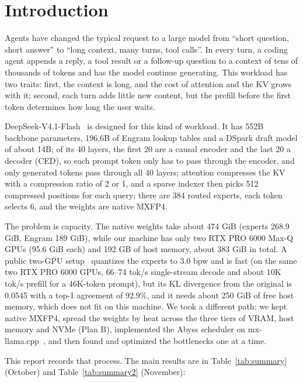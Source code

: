 \documentclass[11pt,a4paper]{article}
\newcommand{\tps}{tok/s}
\begin{document}
\newpage
\tableofcontents
\newpage

\section{Introduction}

Agents have changed the typical request to a large model from ``short question, short answer'' to ``long context, many turns, tool calls''. In every turn, a coding agent appends a reply, a tool result or a follow-up question to a context of tens of thousands of tokens and has the model continue generating. This workload has two traits: first, the context is long, and the cost of attention and the KV grows with it; second, each turn adds little new content, but the prefill before the first token determines how long the user waits.

DeepSeek-V4.1-Flash~\cite{v41} is designed for this kind of workload. It has 552B backbone parameters, 196.6B of Engram lookup tables and a DSpark draft model of about 14B; of its 40 layers, the first 20 are a causal encoder and the last 20 a decoder (CED), so each prompt token only has to pass through the encoder, and only generated tokens pass through all 40 layers; attention compresses the KV with a compression ratio of 2 or 1, and a sparse indexer then picks 512 compressed positions for each query; there are 384 routed experts, each token selects 6, and the weights are native MXFP4.

The problem is capacity. The native weights take about 474 GiB (experts 268.9 GiB, Engram 189 GiB), while our machine has only two RTX PRO 6000 Max-Q GPUs (95.6 GiB each) and 192 GB of host memory, about 383 GiB in total. A public two-GPU setup~\cite{diffbot} quantizes the experts to 3.0 bpw and is fast (on the same two RTX PRO 6000 GPUs, 66--74 \tps{} single-stream decode and about 10K \tps{} prefill for a 46K-token prompt), but its KL divergence from the original is 0.0545 with a top-1 agreement of 92.9\%, and it needs about 250 GiB of free host memory, which does not fit on this machine. We took a different path: we kept native MXFP4, spread the weights by heat across the three tiers of VRAM, host memory and NVMe (Plan B), implemented the Abyss scheduler on mx-llama.cpp~\cite{mxllama}, and then found and optimized the bottlenecks one at a time.

This report records that process. The main results are in Table~\ref{tab:summary} (October) and Table~\ref{tab:summary2} (November):
\end{document}
